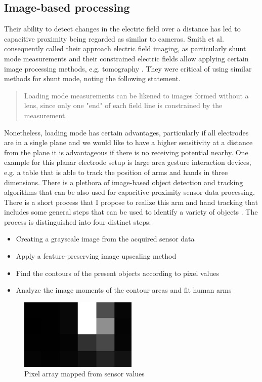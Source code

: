 \subsection{Image-based processing}
\label{ch:proc_image}
Their ability to detect changes in the electric field over a distance has led to capacitive proximity being regarded as similar to cameras. Smith et al. consequently called their approach electric field imaging, as particularly shunt mode measurements and their constrained electric fields allow applying certain image processing methods, e.g. tomography \cite{smith1999thesis}. They were critical of using similar methods for shunt mode, noting the following statement.
\begin{quote}
Loading mode measurements can be likened
to images formed without a lens, since only one "end" of
each field line is constrained by the measurement. \cite{smith1998electric}
\end{quote}
Nonetheless, loading mode has certain advantages, particularly if all electrodes are in a single plane and we would like to have a higher sensitivity at a distance from the plane it is advantageous if there is no receiving potential nearby. One example for this planar electrode setup is large area gesture interaction devices, e.g. a table that is able to track the position of arms and hands in three dimensions. There is a plethora of image-based object detection and tracking algorithms that can be also used for capacitive proximity sensor data processing. There is a short process that I propose to realize this arm and hand tracking that includes some general steps that can be used to identify a variety of objects \cite{Braun2013captap}. The process is distinguished into four distinct steps:
\begin{itemize}
\item Creating a grayscale image from the acquired sensor data
\item Apply a feature-preserving image upscaling method
\item Find the contours of the present objects according to pixel values
\item Analyze the image moments of the contour areas and fit human arms
\end{itemize} 

\begin{figure}[h]
\centering
\includegraphics[width=0.5\textwidth]{images/proc_im_pixels}
\caption{Pixel array mapped from sensor values}
\label{fig:proc_im_pixels}
\end{figure}

